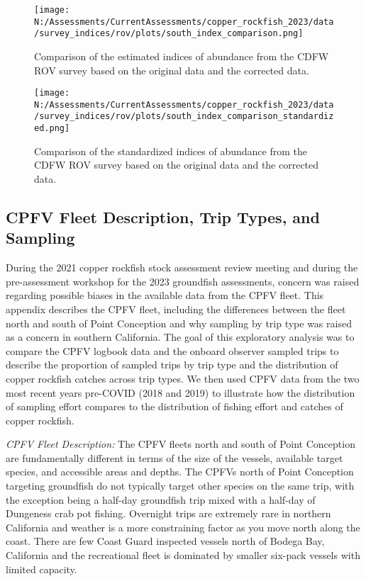 \documentclass[11pt,
  english,
  letterpaper,
]{article}
\begin{document}
\newpage

\begin{figure}
\centering
\texttt{[image: N:/Assessments/CurrentAssessments/copper\_rockfish\_2023/data/survey\_indices/rov/plots/south\_index\_comparison.png]}
\caption{Comparison of the estimated indices of abundance from the CDFW ROV survey based on the original data and the corrected data.\label{fig:rov-corrected-index}}
\end{figure}

\newpage

\begin{figure}
\centering
\texttt{[image: N:/Assessments/CurrentAssessments/copper\_rockfish\_2023/data/survey\_indices/rov/plots/south\_index\_comparison\_standardized.png]}
\caption{Comparison of the standardized indices of abundance from the CDFW ROV survey based on the original data and the corrected data.\label{fig:rov-corrected-index-stand}}
\end{figure}

\newpage

\hypertarget{cpfv-samples}{%
\subsection{CPFV Fleet Description, Trip Types, and Sampling}\label{cpfv-samples}}

During the 2021 copper rockfish stock assessment review meeting and during the pre-assessment workshop for the 2023 groundfish assessments, concern was raised regarding possible biases in the available data from the CPFV fleet. This appendix describes the CPFV fleet, including the differences between the fleet north and south of Point Conception and why sampling by trip type was raised as a concern in southern California. The goal of this exploratory analysis was to compare the CPFV logbook data and the onboard observer sampled trips to describe the proportion of sampled trips by trip type and the distribution of copper rockfish catches across trip types. We then used CPFV data from the two most recent years pre-COVID (2018 and 2019) to illustrate how the distribution of sampling effort compares to the distribution of fishing effort and catches of copper rockfish.

\emph{CPFV Fleet Description:} The CPFV fleets north and south of Point Conception are fundamentally different in terms of the size of the vessels, available target species, and accessible areas and depths. The CPFVs north of Point Conception targeting groundfish do not typically target other species on the same trip, with the exception being a half-day groundfish trip mixed with a half-day of Dungeness crab pot fishing. Overnight trips are extremely rare in northern California and weather is a more constraining factor as you move north along the coast. There are few Coast Guard inspected vessels north of Bodega Bay, California and the recreational fleet is dominated by smaller six-pack vessels with limited capacity.
\end{document}
